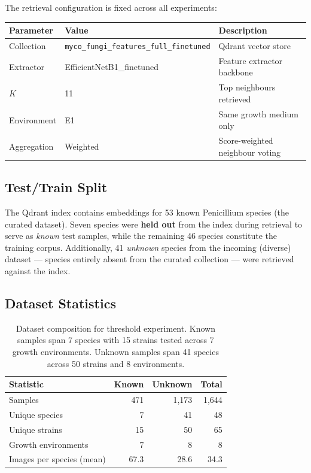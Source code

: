 \documentclass[11pt,a4paper]{article}
\begin{document}
\noindent The retrieval configuration is fixed across all experiments:

\begin{tcolorbox}[colback=blue!3, colframe=blue!30, title={\textbf{Fixed Retrieval Parameters}}, fonttitle=\bfseries]
\begin{tabular}{@{}lll@{}}
\toprule
\textbf{Parameter} & \textbf{Value} & \textbf{Description} \\
\midrule
Collection & \texttt{myco\_fungi\_features\_full\_finetuned} & Qdrant vector store \\
Extractor & EfficientNetB1\_finetuned & Feature extractor backbone \\
$K$ & 11 & Top neighbours retrieved \\
Environment & E1 & Same growth medium only \\
Aggregation & Weighted & Score-weighted neighbour voting \\
\bottomrule
\end{tabular}
\end{tcolorbox}

\subsection{Test/Train Split}

The Qdrant index contains embeddings for 53 known Penicillium species (the curated dataset). Seven species were \textbf{held out} from the index during retrieval to serve as \emph{known} test samples, while the remaining 46 species constitute the training corpus. Additionally, 41 \emph{unknown} species from the incoming (diverse) dataset --- species entirely absent from the curated collection --- were retrieved against the index.

\subsection{Dataset Statistics}

\begin{table}[htbp]
\centering
\caption{Dataset composition for threshold experiment. Known samples span 7 species with 15 strains tested across 7 growth environments. Unknown samples span 41 species across 50 strains and 8 environments.}
\label{tab:dataset}
\begin{tabular}{@{}lrrr@{}}
\toprule
\textbf{Statistic} & \textbf{Known} & \textbf{Unknown} & \textbf{Total} \\
\midrule
Samples & 471 & 1{,}173 & 1{,}644 \\
Unique species & 7 & 41 & 48 \\
Unique strains & 15 & 50 & 65 \\
Growth environments & 7 & 8 & 8 \\
Images per species (mean) & 67.3 & 28.6 & 34.3 \\
\bottomrule
\end{tabular}
\end{table}
\end{document}
